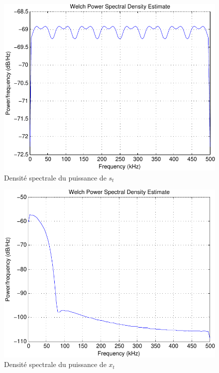 \documentclass[a4paper,11pt]{article}
\begin{document}
\begin{figure}[htb]
	\begin{center}
	\includegraphics[scale=1]{welch_s_t-crop.pdf}
	\caption{Densité spectrale du puissance de $s_t$}
	\label{fig:ques4_st}
	\end{center}
\end{figure} 

\begin{figure}[htb]
	\begin{center}
	\includegraphics[scale=1]{welch_x_t-crop.pdf}
	\caption{Densité spectrale du puissance de $x_t$}
	\label{fig:ques4_xt}
	\end{center}
\end{figure} 
\end{document}
